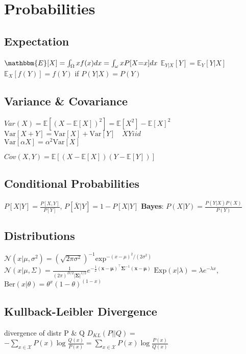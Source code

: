 \section*{Probabilities}
\subsection*{Expectation}
$\mathbbm{E}[X]=\int_{\Omega}xf(x)dx=\int_{\omega}xP[X{=}x]dx$
$\mathbb{E}_{Y|X}[Y]=\mathbb{E}_{Y}[Y|X]$\\
$\mathbb{E}_{X}[f(Y)]{=}f(Y)$ if $P(Y|X)=P(Y)$
\subsection*{Variance \& Covariance}
$Var(X){=}\mathbb{E}[(X{-}\mathbb{E}[X])^2]{=}\mathbb{E}[X^2]{-}\mathbb{E}[X]^2$\\
$\mathrm{Var}[X+Y]{=}\mathrm{Var}[X]+\mathrm{Var}[Y]\quad XY iid$\\
$\mathrm{Var}[\alpha X]=\alpha^2\mathrm{Var}[X]$

$Cov(X,Y)=\mathbb{E}[(X-\mathbb{E}[X])(Y-\mathbb{E}[Y])]$
\subsection*{Conditional Probabilities}
$P[X|Y]=\frac{P[X,Y]}{P[Y]}$, 
$P[\bar{X}|Y]=1-P[X|Y]$
\textbf{Bayes}: $P(X|Y){=}\frac{P(Y|X)P(X)}{P(Y)}$
\subsection*{Distributions}
$\mathcal{N}(x|\mu, \sigma^2){=}(\sqrt{2\pi\sigma^2})^{-1}\mathrm{exp}^{-(x-\mu)^2/(2\sigma^2)}$\\
$\mathcal{N}(x|\mu, \Sigma){=}\frac{1}{(2\pi)^{{D}/{2}}|\mathbf{\Sigma}|^{{1}/{2}}}e^{-\frac{1}{2}(\mathbf{x}-\mathbf{\mu})^\top{\mathbf{\Sigma}^{-1}}(\mathbf{x}{-}\mathbf{\mu})}$
$\mathrm{Exp}(x|\lambda){=}\lambda e^{-\lambda x}$, $\mathrm{Ber}(x|\theta){=}\theta^x (1{-}\theta)^{(1-x)}$

\subsection*{Kullback-Leibler Divergence}
divergence of distr P \& Q $D_{KL}(P||Q){=}$\\$-\sum_{x\in\mathcal{X}}P(x)\log\frac{Q(x)}{P(x)}{=}\sum_{x\in\mathcal{X}}P(x)\log\frac{P(x)}{Q(x)}$

